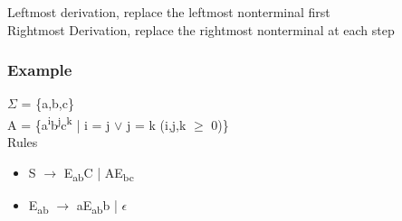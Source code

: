 \documentclass[11pt]{article}
\begin{document}
Leftmost derivation, replace the leftmost nonterminal first\\
Rightmost Derivation, replace the rightmost nonterminal at each step\\
\subsubsection{Example}
\label{sec:org166334b}
\(\Sigma\) = \{a,b,c\}\\
A = \{a\textsuperscript{i}b\textsuperscript{j}c\textsuperscript{k} | i = j \(\vee\) j = k \hat{} (i,j,k \(\ge\) 0)\}\\

Rules\\
\begin{itemize}
\item S \(\rightarrow\) E\textsubscript{ab}C | AE\textsubscript{bc}\\
\item E\textsubscript{ab} \(\rightarrow\) aE\textsubscript{ab}b | \(\epsilon\)\\
\end{itemize}
\end{document}
